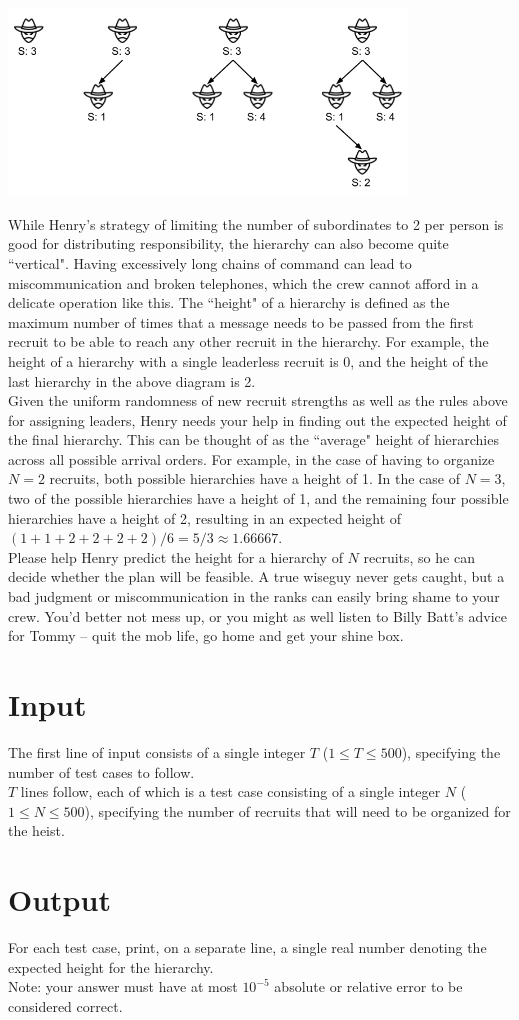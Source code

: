 \begin{center}
\includegraphics[width=300pt]{wiseguy}
\end{center}

While Henry's strategy of limiting the number of subordinates to 2 per person is good for distributing responsibility, the hierarchy can also become quite ``vertical". Having excessively long chains of command can lead to miscommunication and broken telephones, which the crew cannot afford in a delicate operation like this. The ``height" of a hierarchy is defined as the maximum number of times that a message needs to be passed from the first recruit to be able to reach any other recruit in the hierarchy. For example, the height of a hierarchy with a single leaderless recruit is 0, and the height of the last hierarchy in the above diagram is 2.\\

Given the uniform randomness of new recruit strengths as well as the rules above for assigning leaders, Henry needs your help in finding out the expected height of the final hierarchy. This can be thought of as the ``average" height of hierarchies across all possible arrival orders. For example, in the case of having to organize $N = 2$ recruits, both possible hierarchies have a height of 1. In the case of $N = 3$, two of the possible hierarchies have a height of 1, and the remaining four possible hierarchies have a height of 2, resulting in an expected height of $(1 + 1 + 2 + 2 + 2 + 2)/6 = 5/3 \approx 1.66667$.\\

Please help Henry predict the height for a hierarchy of $N$ recruits, so he can decide whether the plan will be feasible. A true wiseguy never gets caught, but a bad judgment or miscommunication in the ranks can easily bring shame to your crew. You'd better not mess up, or you might as well listen to Billy Batt's advice for Tommy -- quit the mob life, go home and get your shine box.\\

\section*{Input}
The first line of input consists of a single integer $T$ ($1 \leq T \leq 500$), specifying the number of test cases to follow.\\
$T$ lines follow, each of which is a test case consisting of a single integer $N$ ($1 \leq N \leq 500$), specifying the number of recruits that will need to be organized for the heist.\\

\section*{Output}
For each test case, print, on a separate line, a single real number denoting the expected height for the hierarchy.\\
Note: your answer must have at most $10^{-5}$ absolute or relative error to be considered correct.\\
